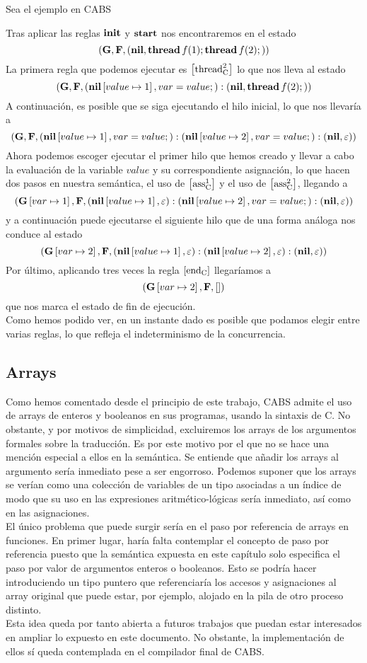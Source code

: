Sea el ejemplo en CABS

Tras aplicar las reglas $\textbf{init}$ y $\textbf{start}$ nos encontraremos en el estado
$$
(\mathbf{G}, \mathbf{F}, (\textbf{nil}, \textbf{thread} \,f(1)\mbox{;\,}\textbf{thread} \,f(2)\mbox{;\,}))
$$
La primera regla que podemos ejecutar es $\left[ \text{thread}_{\text{C}}^2 \right]$ lo que nos lleva al estado
$$
(\mathbf{G}, \mathbf{F}, (\textbf{nil}\left[ value\mapsto1 \right], var = value\mbox{;\,}):(\textbf{nil}, \textbf{thread} \,f(2)\mbox{;\,}))
$$
A continuación, es posible que se siga ejecutando el hilo inicial, lo que nos llevaría a
$$
(\mathbf{G}, \mathbf{F}, (\textbf{nil}\left[ value\mapsto1 \right], var = value\mbox{;\,}):(\textbf{nil}\left[ value\mapsto2 \right], var = value\mbox{;\,}):(\textbf{nil}, \varepsilon))
$$
Ahora podemos escoger ejecutar el primer hilo que hemos creado y llevar a cabo la evaluación de la variable $value$ y su correspondiente asignación, lo que hacen dos pasos en nuestra semántica, el uso de $\left[ \text{ass}_{\text{C}}^{1} \right]$ y el uso de $\left[ \text{ass}_{\text{C}}^{2} \right]$, llegando a
$$
(\mathbf{G}\left[ var\mapsto1 \right], \mathbf{F}, (\textbf{nil}\left[ value\mapsto1 \right], \varepsilon):(\textbf{nil}\left[ value\mapsto2 \right], var = value\mbox{;\,}):(\textbf{nil}, \varepsilon))
$$
y a continuación puede ejecutarse el siguiente hilo que de una forma análoga nos conduce al estado
$$
(\mathbf{G}\left[ var\mapsto2 \right], \mathbf{F}, (\textbf{nil}\left[ value\mapsto1 \right], \varepsilon):(\textbf{nil}\left[ value\mapsto2 \right], \varepsilon):(\textbf{nil}, \varepsilon))
$$
Por último, aplicando tres veces la regla $\left[ \text{end}_{\text{C}} \right]$ llegaríamos a
$$
(\mathbf{G}\left[ var\mapsto2 \right], \mathbf{F}, [])
$$
que nos marca el estado de fin de ejecución.\\

Como hemos podido ver, en un instante dado es posible que podamos elegir entre varias reglas, lo que refleja el indeterminismo de la concurrencia.

\subsection{Arrays}

Como hemos comentado desde el principio de este trabajo, CABS admite el uso de arrays de enteros y booleanos en sus programas, usando la sintaxis de C. No obstante, y por motivos de simplicidad, excluiremos los arrays de los argumentos formales sobre la traducción. Es por este motivo por el que no se hace una mención especial a ellos en la semántica. Se entiende que añadir los arrays al argumento sería inmediato pese a ser engorroso. Podemos suponer que los arrays se verían como una colección de variables de un tipo asociadas a un índice de modo que su uso en las expresiones aritmético-lógicas sería inmediato, así como en las asignaciones.\\

El único problema que puede surgir sería en el paso por referencia de arrays en funciones. En primer lugar, haría falta contemplar el concepto de paso por referencia puesto que la semántica expuesta en este capítulo solo especifica el paso por valor de argumentos enteros o booleanos. Esto se podría hacer introduciendo un tipo puntero que referenciaría los accesos y asignaciones al array original que puede estar, por ejemplo, alojado en la pila de otro proceso distinto.\\

Esta idea queda por tanto abierta a futuros trabajos que puedan estar interesados en ampliar lo expuesto en este documento. No obstante, la implementación de ellos sí queda contemplada en el compilador final de CABS.
